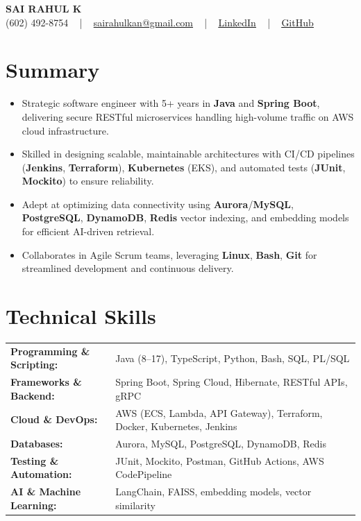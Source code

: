 \documentclass[letterpaper,11pt]{article}
\newcommand{\resumeItem}[1]{
  \item\footnotesize{
    {#1 \vspace{-2pt}}
  }
}
\newcommand{\resumeItemListStart}{\begin{itemize}[leftmargin=*]}
\newcommand{\resumeItemListEnd}{\end{itemize}\vspace{-5pt}}
\begin{document}
\begin{center}
    {\fontsize{14pt}{12pt}\selectfont \textbf{\MakeUppercase{Sai Rahul K}}}\\ \vspace{2pt}
    \fontsize{10pt}{12pt}\selectfont (602) 492-8754 ~ | ~ \href{mailto:sairahulkan@gmail.com}{sairahulkan@gmail.com} ~ | ~
    \href{https://www.linkedin.com/in/rq123/}{\color{blue}\underline{LinkedIn}} ~ | ~
    \href{https://github.com/kanrahuldo}{\color{blue}\underline{GitHub}}~
    \vspace{-8pt}
\end{center}

\section{Summary}
\fontsize{9pt}{10pt}\selectfont
\resumeItemListStart
  \resumeItem{Strategic software engineer with 5+ years in \textbf{Java} and \textbf{Spring Boot}, delivering secure RESTful microservices handling high-volume traffic on AWS cloud infrastructure.}
  \resumeItem{Skilled in designing scalable, maintainable architectures with CI/CD pipelines (\textbf{Jenkins}, \textbf{Terraform}), \textbf{Kubernetes} (EKS), and automated tests (\textbf{JUnit}, \textbf{Mockito}) to ensure reliability.}
  \resumeItem{Adept at optimizing data connectivity using \textbf{Aurora}/\textbf{MySQL}, \textbf{PostgreSQL}, \textbf{DynamoDB}, \textbf{Redis} vector indexing, and embedding models for efficient AI-driven retrieval.}
  \resumeItem{Collaborates in Agile Scrum teams, leveraging \textbf{Linux}, \textbf{Bash}, \textbf{Git} for streamlined development and continuous delivery.}
\resumeItemListEnd
\vspace{-6pt}

\section{Technical Skills}
        \vspace{-14pt}
        \begin{table}[h]
            \fontsize{9pt}{10pt}\selectfont
            \begin{tabular}{p{0.3\linewidth} p{0.7\linewidth}}
                \textbf{Programming \& Scripting:} & Java (8--17), TypeScript, Python, Bash, SQL, PL/SQL \\
                \textbf{Frameworks \& Backend:} & Spring Boot, Spring Cloud, Hibernate, RESTful APIs, gRPC \\
                \textbf{Cloud \& DevOps:} & AWS (ECS, Lambda, API Gateway), Terraform, Docker, Kubernetes, Jenkins \\
                \textbf{Databases:} & Aurora, MySQL, PostgreSQL, DynamoDB, Redis \\
                \textbf{Testing \& Automation:} & JUnit, Mockito, Postman, GitHub Actions, AWS CodePipeline \\
                \textbf{AI \& Machine Learning:} & LangChain, FAISS, embedding models, vector similarity \\
            \end{tabular}
        \end{table}
    \vspace{-15pt}
\end{document}
